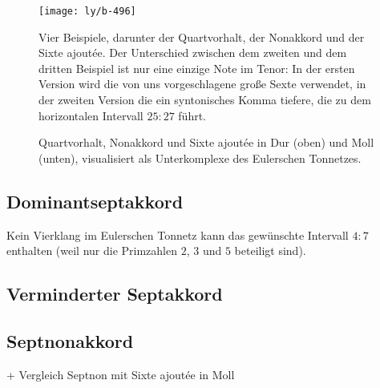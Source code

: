 \documentclass[ngerman,11pt]{scrartcl}
\begin{document}
\begin{figure}
  \centering
  \texttt{[image: ly/b-496]}
  \caption{Vier Beispiele, darunter der Quartvorhalt, der Nonakkord und der
  	Sixte ajoutée. Der Unterschied zwischen dem zweiten und dem dritten Beispiel
  	ist nur eine einzige Note im Tenor: In der ersten Version wird die von uns
  	vorgeschlagene große Sexte verwendet, in der zweiten Version die ein
  	syntonisches Komma tiefere, die zu dem horizontalen Intervall $25:27$
  	führt.}\label{fig:496}
\end{figure}

\begin{figure}
  \centering
  
  \caption{Quartvorhalt, Nonakkord und Sixte ajoutée in Dur
    (oben) und Moll (unten), visualisiert als Unterkomplexe des Eulerschen
    Tonnetzes.}\label{fig:chordLines}
\end{figure}

\subsection{Dominantseptakkord}

Kein Vierklang im Eulerschen Tonnetz kann das gewünschte Intervall $4:7$
enthalten (weil nur die Primzahlen $2$, $3$ und $5$ beteiligt
sind).

\subsection{Verminderter Septakkord}


\subsection{Septnonakkord}

+ Vergleich Septnon mit Sixte ajoutée in Moll
\end{document}

